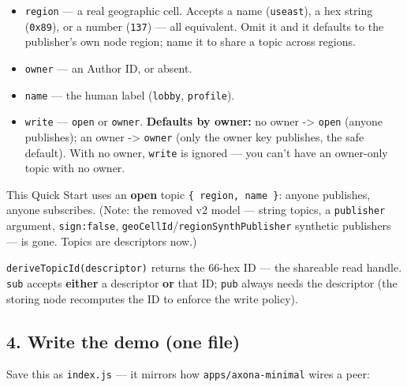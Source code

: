 \documentclass[
  nobib]{tufte-handout}
\providecommand{\tightlist}{%
  \setlength{\itemsep}{0pt}\setlength{\parskip}{0pt}}
\begin{document}
\begin{itemize}
\tightlist
\item
  \texttt{region} --- a real geographic cell. Accepts a name
  (\texttt{\textquotesingle{}useast\textquotesingle{}}), a hex string
  (\texttt{\textquotesingle{}0x89\textquotesingle{}}), or a number
  (\texttt{137}) --- all equivalent. Omit it and it defaults to the
  publisher's own node region; name it to share a topic across regions.
\item
  \texttt{owner} --- an Author ID, or absent.
\item
  \texttt{name} --- the human label
  (\texttt{\textquotesingle{}lobby\textquotesingle{}},
  \texttt{\textquotesingle{}profile\textquotesingle{}}).
\item
  \texttt{write} --- \texttt{\textquotesingle{}open\textquotesingle{}}
  or \texttt{\textquotesingle{}owner\textquotesingle{}}.
  \textbf{Defaults by owner:} no owner -\textgreater{}
  \texttt{\textquotesingle{}open\textquotesingle{}} (anyone publishes);
  an owner -\textgreater{}
  \texttt{\textquotesingle{}owner\textquotesingle{}} (only the owner key
  publishes, the safe default). With no owner, \texttt{write} is ignored
  --- you can't have an owner-only topic with no owner.
\end{itemize}

This Quick Start uses an \textbf{open} topic
\texttt{\{\ region,\ name\ \}}: anyone publishes, anyone subscribes.
(Note: the removed v2 model --- string topics, a \texttt{publisher}
argument, \texttt{sign:false},
\texttt{geoCellId}/\texttt{regionSynthPublisher} synthetic publishers
--- is gone. Topics are descriptors now.)

\texttt{deriveTopicId(descriptor)} returns the 66-hex ID --- the
shareable read handle. \texttt{sub} accepts \textbf{either} a descriptor
\textbf{or} that ID; \texttt{pub} always needs the descriptor (the
storing node recomputes the ID to enforce the write policy).

\subsection{4. Write the demo (one file)}\label{write-the-demo-one-file}

Save this as \texttt{index.js} --- it mirrors how
\texttt{apps/axona-minimal} wires a peer:
\end{document}
